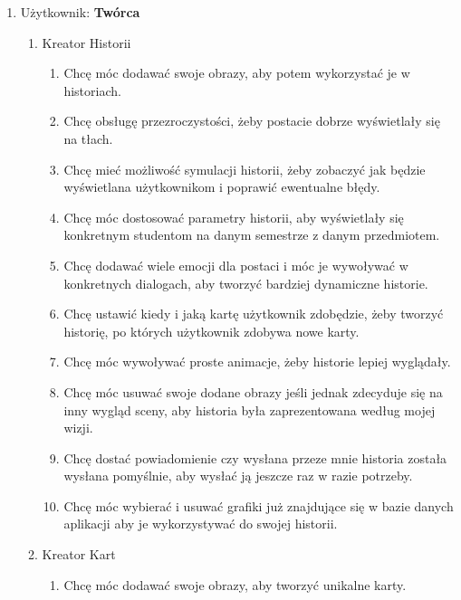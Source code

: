 \documentclass{article}
\begin{document}
\begin{tcolorbox}
\begin{enumerate}
\begin{enumerate}
\begin{enumerate}
                        \end{enumerate}
              \end{enumerate}
        \item Użytkownik: \textbf{Twórca}
              \begin{enumerate}
                  \item Kreator Historii
                        \begin{enumerate}
                            \item Chcę móc dodawać swoje obrazy, aby potem wykorzystać je w historiach.
                            \item Chcę obsługę przezroczystości, żeby postacie dobrze wyświetlały się na tłach.
                            \item Chcę mieć możliwość symulacji historii, żeby zobaczyć jak będzie wyświetlana użytkownikom i poprawić ewentualne błędy.
                            \item Chcę móc dostosować parametry historii, aby wyświetlały się konkretnym studentom na danym semestrze z danym przedmiotem.
                            \item Chcę dodawać wiele emocji dla postaci i móc je wywoływać w konkretnych dialogach, aby tworzyć bardziej dynamiczne historie.
                            \item Chcę ustawić kiedy i jaką kartę użytkownik zdobędzie, żeby tworzyć historię, po których użytkownik zdobywa nowe karty.
                            \item Chcę móc wywoływać proste animacje, żeby historie lepiej wyglądały.
                            \item Chcę móc usuwać swoje dodane obrazy jeśli jednak zdecyduje się na inny wygląd sceny, aby historia była zaprezentowana według mojej wizji.
                            \item Chcę dostać powiadomienie czy wysłana przeze mnie historia została wysłana pomyślnie, aby wysłać ją jeszcze raz w razie potrzeby.
                            \item Chcę móc wybierać i usuwać grafiki już znajdujące się w bazie danych aplikacji aby je wykorzystywać do swojej historii.
                        \end{enumerate}
                  \item Kreator Kart
                        \begin{enumerate}
                            \item Chcę móc dodawać swoje obrazy, aby tworzyć unikalne karty.

\end{enumerate}
\end{enumerate}
\end{enumerate}
\end{tcolorbox}
\end{document}

